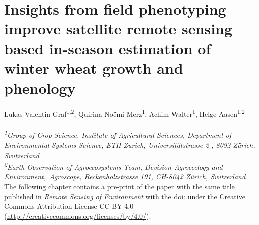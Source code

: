 \chapter{Insights from field phenotyping improve satellite remote sensing based in-season estimation of winter wheat growth and phenology}
\label{chap:insights}
\graphicspath{{./05-Insights/img}}

Lukas Valentin Graf\textsuperscript{1,2}, Quirina Noëmi Merz\textsuperscript{1}, Achim Walter\textsuperscript{1}, Helge Aasen\textsuperscript{1,2}
\\
\normalsize
\vspace{2pt}
\\
\textit{\textsuperscript{1}Group of Crop Science, Institute of Agricultural Sciences, Department of Environmental Systems Science, ETH Zurich, Universitätstrasse 2 , 8092 Zürich, Switzerland
\\
\textsuperscript{2}Earth Observation of Agroecosystems Team, Devision Agroecology and Environment,\ Agroscope, Reckenholzstrasse 191, CH-8042 Zürich, Switzerland
\vspace{2cm}}
\\

The following chapter contains a pre-print of the paper with the same title published in \textsl{Remote Sensing of Environment} with the doi:  under the Creative Commons Attribution License CC BY 4.0 (\url{http://creativecommons.org/licenses/by/4.0/}).


